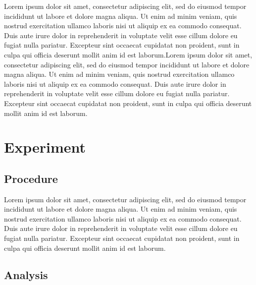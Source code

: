 \documentclass[%
reprint,
amsmath,amssymb,
pra,
nofootinbib,
floatfix
]{revtex4-1}
\begin{document}
	
	Lorem ipsum dolor sit amet, consectetur adipiscing elit, sed do eiusmod tempor incididunt ut labore et dolore magna aliqua. Ut enim ad minim veniam, quis nostrud exercitation ullamco laboris nisi ut aliquip ex ea commodo consequat. Duis aute irure dolor in reprehenderit in voluptate velit esse cillum dolore eu fugiat nulla pariatur. Excepteur sint occaecat cupidatat non proident, sunt in culpa qui officia deserunt mollit anim id est laborum.Lorem ipsum dolor sit amet, consectetur adipiscing elit, sed do eiusmod tempor incididunt ut labore et dolore magna aliqua. Ut enim ad minim veniam, quis nostrud exercitation ullamco laboris nisi ut aliquip ex ea commodo consequat. Duis aute irure dolor in reprehenderit in voluptate velit esse cillum dolore eu fugiat nulla pariatur. Excepteur sint occaecat cupidatat non proident, sunt in culpa qui officia deserunt mollit anim id est laborum.
	
	\section{Experiment}
	
	\subsection{Procedure}
	
	Lorem ipsum dolor sit amet, consectetur adipiscing elit, sed do eiusmod tempor incididunt ut labore et dolore magna aliqua. Ut enim ad minim veniam, quis nostrud exercitation ullamco laboris nisi ut aliquip ex ea commodo consequat. Duis aute irure dolor in reprehenderit in voluptate velit esse cillum dolore eu fugiat nulla pariatur. Excepteur sint occaecat cupidatat non proident, sunt in culpa qui officia deserunt mollit anim id est laborum.
		
	\subsection{Analysis}
	
\end{document}
